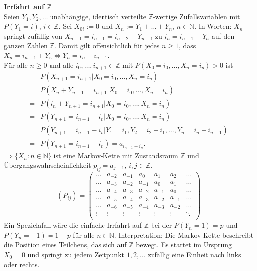 \documentclass[a4paper,12pt]{article}
\begin{document}
\begin{tcolorbox}[breakable, colframe=blue, colback=white, title=Beispiel 3]
	\textbf{Irrfahrt auf $\mathbb{Z}$}\\
	
	Seien $Y_1, Y_2, \dots$ unabhängige, identisch verteilte $\mathbb{Z}$-wertige Zufallsvariablen mit $P(Y_1 = i)$, $i \in \mathbb{Z}$.
	Sei $X_{0i} := 0$ und $X_n := Y_1 + \dots + Y_n$, $n \in \mathbb{N}$. 
	In Worten: $X_n$ springt zufällig von $X_{n-1} = i_{n-1} = i_{n-2} + Y_{n-1}$ zu $i_n = i_{n-1} + Y_n$ auf den ganzen Zahlen $\mathbb{Z}$.
	Damit gilt offensichtlich für jedes $n \geq 1$, dass $X_n = i_{n-1} + Y_{n} \Leftrightarrow Y_n = i_n - i_{n-1}$.\\
	Für alle $n \geq 0$ und alle $i_0, \dots, i_{n+1} \in \mathbb{Z}$ mit $P(X_0 = i_0, \dots, X_n = i_n) > 0$ ist
	\begin{align*}
		&  P(X_{n+1} = i_{n+1} | X_0 = i_0, \dots, X_n = i_n) \\
		=&  P(X_n + Y_{n+1} = i_{n+1} | X_0 = i_0, \dots, X_n = i_n) \\
		= & P(i_n + Y_{n+1} = i_{n+1} | X_0 = i_0, \dots, X_n = i_n) \\
		=&  P(Y_{n+1} = i_{n+1} - i_n | X_0 = i_0, \dots, X_n = i_n) \\
		=&  P(Y_{n+1} = i_{n+1} - i_n | Y_1 = i_1, Y_2 = i_2 - i_1, \dots, Y_n = i_n - i_{n-1}) \\
		=&  P(Y_{n+1} = i_{n+1} - i_n) = a_{i_{n+1} - i_n}.
	\end{align*}
	$\Rightarrow \{X_n: n\in \mathbb{N}\}$ ist eine Markov-Kette mit Zustandsraum $\mathbb{Z}$ und Übergangswahrscheinlichkeit $p_{ij} =a_{j-1}$, $i,j \in \mathbb{Z}$.
	$$
	\left( P_{ij} \right) = 
	\begin{pmatrix}
		\dots & a_{-2} & a_{-1} & a_0 & a_1 & a_2 & \dots \\
		\dots & a_{-3} & a_{-2} & a_{-1} & a_0 & a_1 & \dots \\
		\dots & a_{-4} & a_{-3} & a_{-2} & a_{-1} & a_0 & \dots \\
		\dots & a_{-5} & a_{-4} & a_{-3} & a_{-2} & a_{-1} & \dots \\
		\dots & a_{-6} & a_{-5} & a_{-4} & a_{-3} & a_{-2} & \dots \\
		\vdots & \vdots & \vdots & \vdots & \vdots & \vdots & \ddots \\
	\end{pmatrix}
	$$
	Ein Spezielafall wäre die einfache Irrfahrt auf $\mathbb{Z}$ bei der $P(Y_n =1) = p$ und $P(Y_n = -1) = 1-p$ für alle $n \in \mathbb{N}$.
	Interpretation: Die Markov-Kette beschreibt die Position eines Teilchens, das sich auf $\mathbb{Z}$ bewegt. Es startet im Ursprung $X_0 = 0$ und springt zu jedem Zeitpunkt $1,2, ...$ zufällig eine Einheit nach links oder rechts.
\end{tcolorbox}
\end{document}
